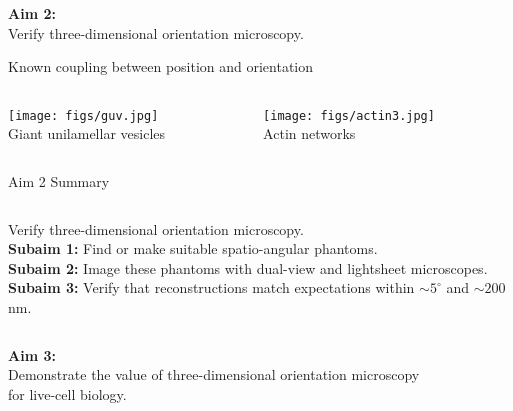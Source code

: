 \documentclass[presentation]{beamer}
\begin{document}
\begin{frame}{}
  \begin{center}
    \textbf{Aim 2:}\\ \vspace{1em}
    Verify three-dimensional orientation microscopy.
  \end{center}
\end{frame}

\begin{frame}{Known coupling between position and orientation}
  \begin{columns}
    \begin{column}{0.5\textwidth}
       \begin{center}
   \texttt{[image: figs/guv.jpg]}\\ \vspace{0.5em}
    Giant unilamellar vesicles
  \end{center}
    \end{column}
    \begin{column}{0.5\textwidth}
       \begin{center}
   \texttt{[image: figs/actin3.jpg]}\\ \vspace{0.5em}
    Actin networks
  \end{center}
    \end{column}
  \end{columns}
\end{frame}

\begin{frame}{Aim 2 Summary}
  \begin{columns}
    \begin{column}{0.75\textwidth}
    Verify three-dimensional orientation microscopy.\\ \vspace{1em}
    \textbf{Subaim 1:} 
    Find or make suitable spatio-angular phantoms. \\ \vspace{1em}
    \textbf{Subaim 2:}
    Image these phantoms with dual-view and lightsheet microscopes.\\ \vspace{1em}
    \textbf{Subaim 3:}
    Verify that reconstructions match expectations within $\sim 5^{\circ}$ and $\sim 200$ nm. 
    \end{column}
  \end{columns}
  \end{frame}

\begin{frame}{}
  \begin{center}
    \textbf{Aim 3:}\\ \vspace{1em}
    Demonstrate the value of three-dimensional
    orientation microscopy\\ for live-cell biology.
  \end{center}
\end{frame}
\end{document}
